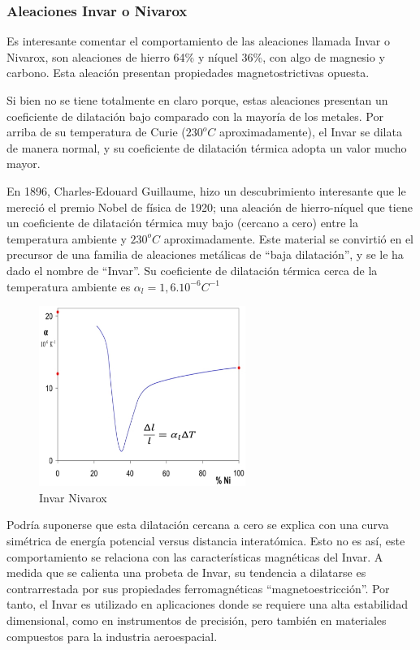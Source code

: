 \subsubsection{Aleaciones Invar o Nivarox}

Es interesante comentar el comportamiento de las aleaciones llamada Invar o Nivarox, son aleaciones de hierro 64\% y níquel 36\%, con algo de magnesio y carbono. Esta aleación presentan propiedades magnetostrictivas opuesta.

Si bien no se tiene totalmente en claro porque, estas aleaciones presentan un coeficiente de dilatación bajo comparado con la mayoría de los metales. Por arriba de su temperatura de Curie ($230^{o}C$ aproximadamente), el Invar se dilata de manera normal, y su coeficiente de dilatación térmica adopta un valor mucho mayor.

En 1896, Charles-Edouard Guillaume, hizo un descubrimiento interesante que le mereció el premio Nobel de física de 1920; una aleación de hierro-níquel que tiene un coeficiente de dilatación térmica muy bajo (cercano a cero) entre la temperatura ambiente y $230^{o}C$  aproximadamente. Este material se convirtió en el precursor de una familia de aleaciones metálicas de “baja dilatación”, y se le ha dado el nombre de “Invar”. Su coeficiente de dilatación térmica cerca de la temperatura ambiente es $\alpha_{l} = 1,6.10^{−6}C^{−1}$

\begin{figure}[H]
    \centering
    \includegraphics[width=0.6\textwidth]{./Figures/invarNivarox}
	\caption{Invar Nivarox}
	\label{fig:invarNivarox}
\end{figure}

Podría suponerse que esta dilatación cercana a cero se explica con una curva simétrica de energía potencial versus distancia interatómica. Esto no es así, este comportamiento se relaciona con las características magnéticas del Invar. A medida que se calienta una probeta de Invar, su tendencia a dilatarse es contrarrestada por sus propiedades ferromagnéticas “magnetoestricción”. Por tanto, el Invar es utilizado en aplicaciones donde se requiere una alta estabilidad dimensional, como en instrumentos de precisión, pero también en materiales compuestos para la industria aeroespacial.



